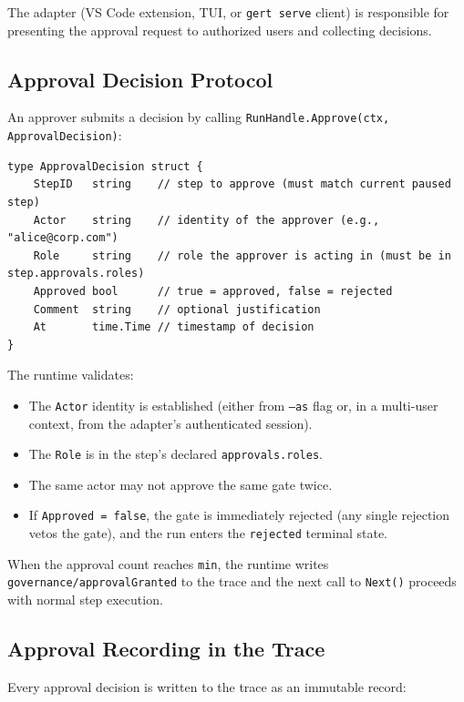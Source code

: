The adapter (VS Code extension, TUI, or \texttt{gert serve} client) is responsible for
presenting the approval request to authorized users and collecting decisions.

\subsection{Approval Decision Protocol}

An approver submits a decision by calling \texttt{RunHandle.Approve(ctx, ApprovalDecision)}:

\begin{verbatim}
type ApprovalDecision struct {
    StepID   string    // step to approve (must match current paused step)
    Actor    string    // identity of the approver (e.g., "alice@corp.com")
    Role     string    // role the approver is acting in (must be in step.approvals.roles)
    Approved bool      // true = approved, false = rejected
    Comment  string    // optional justification
    At       time.Time // timestamp of decision
}
\end{verbatim}

The runtime validates:
\begin{itemize}
  \item The \texttt{Actor} identity is established (either from \texttt{--as} flag or,
        in a multi-user context, from the adapter's authenticated session).
  \item The \texttt{Role} is in the step's declared \texttt{approvals.roles}.
  \item The same actor may not approve the same gate twice.
  \item If \texttt{Approved = false}, the gate is immediately rejected (any single rejection
        vetos the gate), and the run enters the \texttt{rejected} terminal state.
\end{itemize}

When the approval count reaches \texttt{min}, the runtime writes
\texttt{governance/approvalGranted} to the trace and the next call to \texttt{Next()}
proceeds with normal step execution.

\subsection{Approval Recording in the Trace}

Every approval decision is written to the trace as an immutable record:

